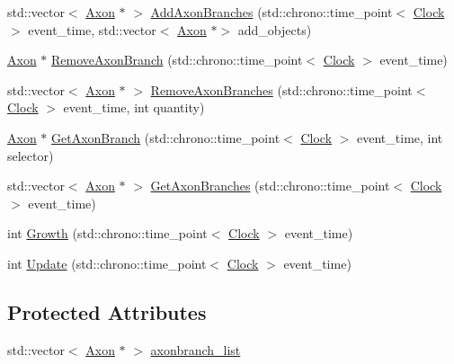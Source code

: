 \begin{DoxyCompactItemize}
\item 
std\+::vector$<$ \mbox{\hyperlink{classAxon}{Axon}} $\ast$ $>$ \mbox{\hyperlink{classAxon_a04969d98c3fbb671cba5daccacffc003}{Add\+Axon\+Branches}} (std\+::chrono\+::time\+\_\+point$<$ \mbox{\hyperlink{universe_8h_a0ef8d951d1ca5ab3cfaf7ab4c7a6fd80}{Clock}} $>$ event\+\_\+time, std\+::vector$<$ \mbox{\hyperlink{classAxon}{Axon}} $\ast$$>$ add\+\_\+objects)
\item 
\mbox{\hyperlink{classAxon}{Axon}} $\ast$ \mbox{\hyperlink{classAxon_a7b43ca7f5b696c72ac17a27fea3b2822}{Remove\+Axon\+Branch}} (std\+::chrono\+::time\+\_\+point$<$ \mbox{\hyperlink{universe_8h_a0ef8d951d1ca5ab3cfaf7ab4c7a6fd80}{Clock}} $>$ event\+\_\+time)
\item 
std\+::vector$<$ \mbox{\hyperlink{classAxon}{Axon}} $\ast$ $>$ \mbox{\hyperlink{classAxon_a4c7af6c0900ae766c55362bfbb827ce3}{Remove\+Axon\+Branches}} (std\+::chrono\+::time\+\_\+point$<$ \mbox{\hyperlink{universe_8h_a0ef8d951d1ca5ab3cfaf7ab4c7a6fd80}{Clock}} $>$ event\+\_\+time, int quantity)
\item 
\mbox{\hyperlink{classAxon}{Axon}} $\ast$ \mbox{\hyperlink{classAxon_a723b00504169712e47f7437111ad4ae3}{Get\+Axon\+Branch}} (std\+::chrono\+::time\+\_\+point$<$ \mbox{\hyperlink{universe_8h_a0ef8d951d1ca5ab3cfaf7ab4c7a6fd80}{Clock}} $>$ event\+\_\+time, int selector)
\item 
std\+::vector$<$ \mbox{\hyperlink{classAxon}{Axon}} $\ast$ $>$ \mbox{\hyperlink{classAxon_adf5796ef2f72ce56516b37e7e09e9d6c}{Get\+Axon\+Branches}} (std\+::chrono\+::time\+\_\+point$<$ \mbox{\hyperlink{universe_8h_a0ef8d951d1ca5ab3cfaf7ab4c7a6fd80}{Clock}} $>$ event\+\_\+time)
\item 
int \mbox{\hyperlink{classAxon_a0065c335bc57e0a75962bcbd91f35001}{Growth}} (std\+::chrono\+::time\+\_\+point$<$ \mbox{\hyperlink{universe_8h_a0ef8d951d1ca5ab3cfaf7ab4c7a6fd80}{Clock}} $>$ event\+\_\+time)
\item 
int \mbox{\hyperlink{classAxon_a472ee760a1727072afaff0035d1eedd9}{Update}} (std\+::chrono\+::time\+\_\+point$<$ \mbox{\hyperlink{universe_8h_a0ef8d951d1ca5ab3cfaf7ab4c7a6fd80}{Clock}} $>$ event\+\_\+time)
\end{DoxyCompactItemize}
\subsection*{Protected Attributes}
\begin{DoxyCompactItemize}
\item 
std\+::vector$<$ \mbox{\hyperlink{classAxon}{Axon}} $\ast$ $>$ \mbox{\hyperlink{classAxon_ab32c0e4335cc4da8fe1aace7c16a88bf}{axonbranch\+\_\+list}}
\end{DoxyCompactItemize}
